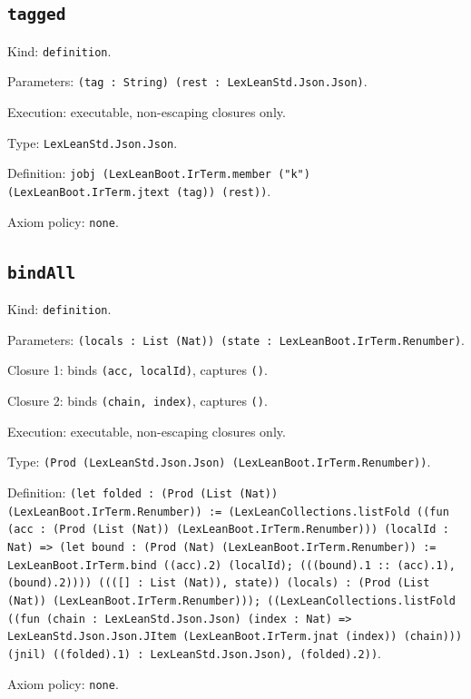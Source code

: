\documentclass[11pt]{article}
\begin{document}
\subsection*{\texttt{tagged}}
\noindent Kind: \texttt{definition}.\par
\noindent Parameters: \texttt{(tag : String) (rest : LexLeanStd.Json.Json)}.\par
\noindent Execution: executable, non-escaping closures only.\par
\noindent Type: \texttt{LexLeanStd.Json.Json}.\par
\noindent Definition: \texttt{jobj (LexLeanBoot.IrTerm.member ("k") (LexLeanBoot.IrTerm.jtext (tag)) (rest))}.\par
\noindent Axiom policy: \texttt{none}.\par
\subsection*{\texttt{bindAll}}
\noindent Kind: \texttt{definition}.\par
\noindent Parameters: \texttt{(locals : List (Nat)) (state : LexLeanBoot.IrTerm.Renumber)}.\par
\noindent Closure 1: binds \texttt{(acc, localId)}, captures \texttt{()}.\par
\noindent Closure 2: binds \texttt{(chain, index)}, captures \texttt{()}.\par
\noindent Execution: executable, non-escaping closures only.\par
\noindent Type: \texttt{(Prod (LexLeanStd.Json.Json) (LexLeanBoot.IrTerm.Renumber))}.\par
\noindent Definition: \texttt{(let folded : (Prod (List (Nat)) (LexLeanBoot.IrTerm.Renumber)) := (LexLeanCollections.listFold ((fun (acc : (Prod (List (Nat)) (LexLeanBoot.IrTerm.Renumber))) (localId : Nat) => (let bound : (Prod (Nat) (LexLeanBoot.IrTerm.Renumber)) := LexLeanBoot.IrTerm.bind ((acc).2) (localId); (((bound).1 :: (acc).1), (bound).2)))) ((([] : List (Nat)), state)) (locals) : (Prod (List (Nat)) (LexLeanBoot.IrTerm.Renumber))); ((LexLeanCollections.listFold ((fun (chain : LexLeanStd.Json.Json) (index : Nat) => LexLeanStd.Json.Json.JItem (LexLeanBoot.IrTerm.jnat (index)) (chain))) (jnil) ((folded).1) : LexLeanStd.Json.Json), (folded).2))}.\par
\noindent Axiom policy: \texttt{none}.\par
\end{document}
